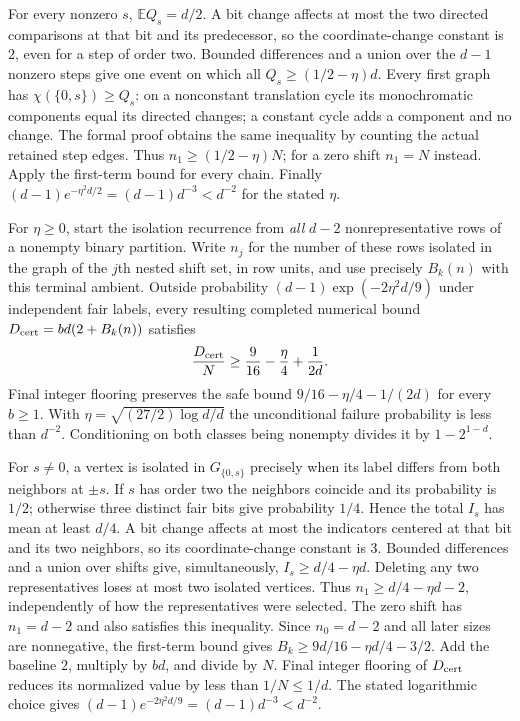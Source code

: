 \begin{outline}
For every nonzero $s$, $\mathbb E Q_s=d/2$. A bit change affects at most
the two directed comparisons at that bit and its predecessor, so the
coordinate-change constant is $2$, even for a step of order two.
Bounded differences and a union over the $d-1$ nonzero steps give one
event on which all $Q_s\ge(1/2-\eta)d$. Every first graph has
$\chi(\{0,s\})\ge Q_s$: on a nonconstant translation cycle its
monochromatic components equal its directed changes; a constant cycle
adds a component and no change. The formal proof obtains the same
inequality by counting the actual retained step edges. Thus
$n_1\ge(1/2-\eta)N$; for a zero shift $n_1=N$ instead. Apply the first-term
bound for every chain. Finally
$(d-1)e^{-\eta^2d/2}=(d-1)d^{-3}<d^{-2}$ for the stated $\eta$.
\end{outline}

\begin{theorem}\label{thm:isolation-method-floor}
For $\eta\ge0$, start the isolation recurrence from \emph{all} $d-2$ nonrepresentative
rows of a nonempty binary partition. Write $n_j$ for the number of these
rows isolated in the graph of the $j$th nested shift set, in row units,
and use precisely $B_k(n)$ with this terminal ambient. Outside probability
$(d-1)\exp(-2\eta^2d/9)$ under independent fair labels, every resulting
completed numerical bound $D_{\rm cert}=bd(2+B_k(n))$ satisfies
\[
 \frac{D_{\rm cert}}{N}\ge\frac9{16}-\frac\eta4+\frac1{2d}.
\]
Final integer flooring preserves the safe bound
$9/16-\eta/4-1/(2d)$ for every $b\ge1$. With
$\eta=\sqrt{(27/2)\log d/d}$ the unconditional failure probability is
less than $d^{-2}$. Conditioning on both classes being nonempty divides
it by $1-2^{1-d}$.
\end{theorem}

\begin{outline}
For $s\ne0$, a vertex is isolated in $G_{\{0,s\}}$ precisely when its
label differs from both neighbors at $\pm s$. If $s$ has order two the
neighbors coincide and its probability is $1/2$; otherwise three distinct
fair bits give probability $1/4$. Hence the total $I_s$ has mean at least
$d/4$. A bit change affects at most the indicators centered at that bit
and its two neighbors, so its coordinate-change constant is $3$.
Bounded differences and a union over shifts give, simultaneously,
$I_s\ge d/4-\eta d$. Deleting any two representatives loses at most two
isolated vertices. Thus $n_1\ge d/4-\eta d-2$, independently of how the
representatives were selected. The zero shift has $n_1=d-2$ and also
satisfies this inequality. Since $n_0=d-2$ and all later sizes are
nonnegative, the first-term bound gives
$B_k\ge9d/16-\eta d/4-3/2$. Add the baseline $2$, multiply by $bd$, and
divide by $N$. Final integer flooring of $D_{\rm cert}$ reduces its normalized value
by less than $1/N\le1/d$. The stated logarithmic choice gives
$(d-1)e^{-2\eta^2d/9}=(d-1)d^{-3}<d^{-2}$.
\end{outline}

